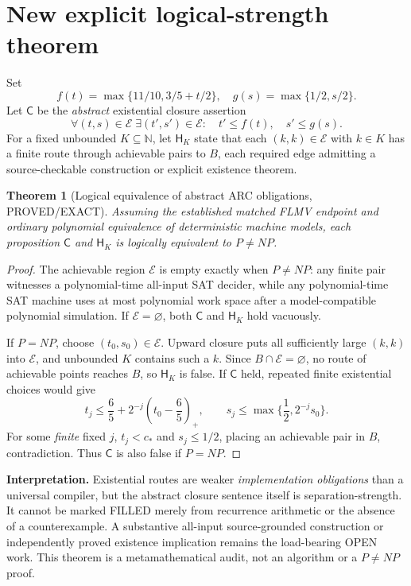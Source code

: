 \documentclass[11pt]{article}
\newtheorem{theorem}{Theorem}
\newcommand{\EE}{\mathcal E}
\begin{document}
\section{New explicit logical-strength theorem}
Set
\[
f(t)=\max\{11/10,3/5+t/2\},\quad
g(s)=\max\{1/2,s/2\}.
\]
Let $\mathsf C$ be the \emph{abstract} existential closure assertion
\[
\forall(t,s)\in\EE\;\exists(t',s')\in\EE:
\quad t'\le f(t),\quad s'\le g(s).
\]
For a fixed unbounded $K\subseteq\mathbb N$, let $\mathsf H_K$ state that each $(k,k)\in\EE$ with $k\in K$ has a finite route through achievable pairs to $B$, each required edge admitting a source-checkable construction or explicit existence theorem.

\begin{theorem}[Logical equivalence of abstract ARC obligations, PROVED/EXACT]
Assuming the established matched FLMV endpoint and ordinary polynomial equivalence of deterministic machine models, each proposition $\mathsf C$ and $\mathsf H_K$ is logically equivalent to $P\ne NP$.
\end{theorem}
\begin{proof}
The achievable region $\EE$ is empty exactly when $P\ne NP$: any finite pair witnesses a polynomial-time all-input SAT decider, while any polynomial-time SAT machine uses at most polynomial work space after a model-compatible polynomial simulation. If $\EE=\varnothing$, both $\mathsf C$ and $\mathsf H_K$ hold vacuously.

If $P=NP$, choose $(t_0,s_0)\in\EE$. Upward closure puts all sufficiently large $(k,k)$ into $\EE$, and unbounded $K$ contains such a $k$. Since $B\cap\EE=\varnothing$, no route of achievable points reaches $B$, so $\mathsf H_K$ is false. If $\mathsf C$ held, repeated finite existential choices would give
\[
t_j\le\frac65+2^{-j}(t_0-\frac65)_+,\qquad
s_j\le\max\{\frac12,2^{-j}s_0\}.
\]
For some \emph{finite} fixed $j$, $t_j<c_*$ and $s_j\le1/2$, placing an achievable pair in $B$, contradiction. Thus $\mathsf C$ is also false if $P=NP$.
\end{proof}
\noindent\textbf{Interpretation.} Existential routes are weaker \emph{implementation obligations} than a universal compiler, but the abstract closure sentence itself is separation-strength. It cannot be marked FILLED merely from recurrence arithmetic or the absence of a counterexample. A substantive all-input source-grounded construction or independently proved existence implication remains the load-bearing OPEN work. This theorem is a metamathematical audit, not an algorithm or a $P\ne NP$ proof.
\end{document}
